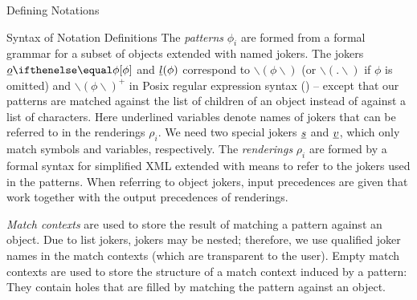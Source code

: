 \begin{omgroup}[creators=miko,short={Notation and Presentation},id=pres]
\begin{omgroup}[creators={miko,frabe},id=sec:ntn-definition]{Defining Notations}
\begin{omgroup}[id=sec:nd:syntax]{Syntax of Notation Definitions}
The \emph{patterns} $\phi_i$ are formed from a formal grammar for a subset of {\openmath} objects extended with named jokers. The jokers $\JObj[\phi]{o}$ and $\underline{l}(\phi)$ correspond to $\backslash(\phi\backslash)$ (or $\backslash(.\backslash)$ if $\phi$ is omitted) and $\backslash(\phi\backslash)^+$ in Posix regular expression syntax (\cite{posix}) -- except that our patterns are matched against the list of children of an {\openmath} object instead of against a list of characters. Here underlined variables denote names of jokers that can be referred to in the renderings $\rho_i$. We need two special jokers $\underline{s}$ and $\underline{v}$, which only match {\openmath} symbols and variables, respectively. The \emph{renderings} $\rho_i$ are formed by a formal syntax for simplified XML extended with means to refer to the jokers used in the patterns. When referring to object jokers, input precedences are given that work together with the output precedences of renderings.

\emph{Match contexts} are used to store the result of matching a pattern against an object. Due to list jokers, jokers may be nested; therefore, we use qualified joker names in the match contexts (which are transparent to the user). Empty match contexts are used to store the structure of a match context induced by a pattern: They contain holes that are filled by matching the pattern against an object.


\end{omgroup}
\end{omgroup}
\end{omgroup}
